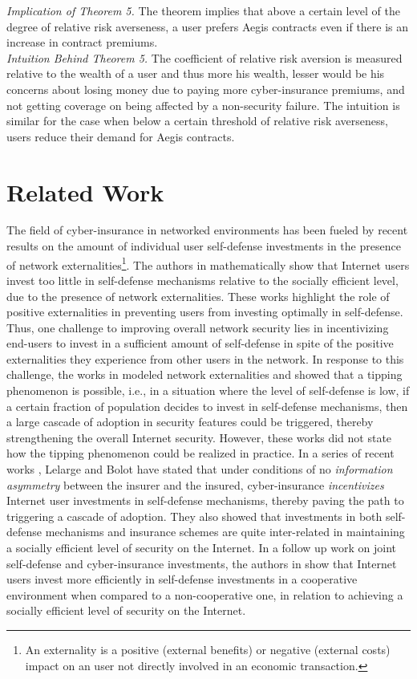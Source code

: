 \documentclass[letterpaper,12pt, onecolumn, nodraft]{IEEEtran}
\begin{document}
\begin{itemize}
\emph{Implication of Theorem 5.} The theorem implies that above a certain level of the degree of relative risk averseness, a user prefers Aegis contracts even if there is an increase in contract premiums. \\
\emph{Intuition Behind Theorem 5.} The coefficient of relative risk aversion is measured relative to the wealth of a user and thus more his wealth, lesser would be his concerns about losing money due to paying more cyber-insurance premiums, and not getting coverage on being affected by a non-security failure. The intuition is similar for the case when below a certain threshold of relative risk averseness, users reduce their demand for Aegis contracts. 

\section{Related Work}	\label{sec-related}
The field of cyber-insurance in networked environments has been fueled
by recent results on the amount of individual user self-defense investments
in the presence of network externalities\footnote{
	An externality  is a positive (external benefits) or negative (external costs) impact on an user not directly involved in an economic transaction.}.
The authors in \cite{gccr}\cite{jaw}\cite{leb5}\cite{leb4}\cite{mybm}\cite{oom} mathematically show
that Internet users invest too little in self-defense mechanisms relative
to the socially efficient level, due to the presence of network externalities.
These works highlight the role of positive externalities in preventing
users from investing optimally in self-defense. Thus, one challenge to
improving overall network security lies in incentivizing end-users to
invest in a sufficient amount of self-defense in spite of the
positive externalities they experience from other users in the network.
In response to this challenge, the works in \cite{leb5}\cite{leb4} modeled
network externalities and showed that a tipping phenomenon is possible,
i.e., in a situation where the level of self-defense is low, if a certain
fraction of population decides to invest in self-defense mechanisms,
then a large cascade of adoption in security features could be triggered,
thereby strengthening the overall Internet security. However, these
works did not state how the tipping phenomenon could be realized in
practice. In a series of recent works \cite{leb3}\cite{leb}, Lelarge and Bolot
have stated that under conditions of
no \emph{information asymmetry} \cite{wik}\cite{hv} between the insurer and
the insured, cyber-insurance \emph{incentivizes} Internet user investments
in self-defense mechanisms, thereby paving the path to triggering a cascade
of adoption. They also showed that investments in both self-defense mechanisms
and insurance schemes are quite inter-related in maintaining a socially
efficient level of security on the Internet. In a follow up work on joint self-defense and cyber-insurance investments, the authors in \cite{pg} show that Internet users invest more efficiently in self-defense investments in a cooperative environment when compared to a non-cooperative one, in relation to achieving a socially efficient level of security on the Internet. 


\end{itemize}
\end{document}
